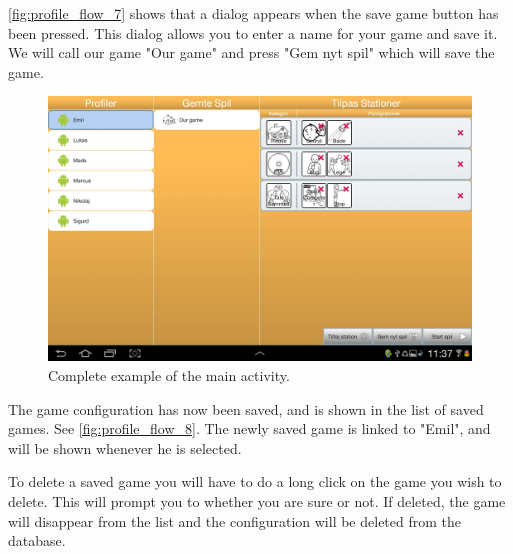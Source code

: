 \autoref{fig:profile_flow_7} shows that a dialog appears when the save game button has been pressed. This dialog allows you to enter a name for your game and save it. We will call our game "Our game" and press "Gem nyt spil" which will save the game.

\begin{figure}[H]
\centering
\includegraphics[width=1.0\linewidth]{img/screenshots/profile_flow_8.jpg}%
\caption{Complete example of the main activity.}
\label{fig:profile_flow_8}
\end{figure}

The game configuration has now been saved, and is shown in the list of saved games. See \autoref{fig:profile_flow_8}. The newly saved game is linked to "Emil", and will be shown whenever he is selected.

To delete a saved game you will have to do a long click on the game you wish to delete. This will prompt you to whether you are sure or not. If deleted, the game will disappear from the list and the configuration will be deleted from the database.

